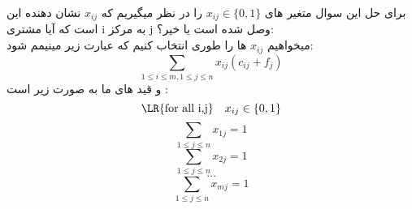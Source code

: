 \problem{}
برای حل این سوال متغیر های $x_{ij} \in \{0,1\}$ را
در نظر میگیریم که $x_{ij}$ نشان دهنده این است که آیا مشتری i به
مرکز j وصل شده است یا خیر؟:\\
میخواهیم $x_{ij}$  ها را طوری انتخاب کنیم که عبارت زیر مینیمم شود:
\[ \sum_{1\leq i\leq m ,1\leq j\leq n}{x_{ij}(c_{ij}+f_j)} \]
و قید های ما به صورت زیر است :\\
\[ \text{\LR{for all i,j}} \quad x_{ij} \in \{0,1\} \]
\[ \sum_{1\leq j\leq n}{x_{1j}} = 1\]
\[ \sum_{1\leq j\leq n}{x_{2j}} = 1\]
\[ \dots \]
\[ \sum_{1\leq j\leq n}{x_{mj}} = 1\]